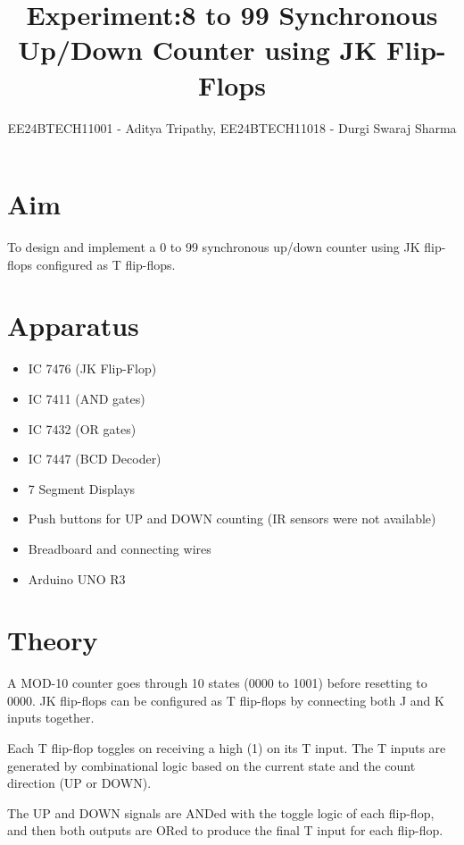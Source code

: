 \documentclass[a4paper,12pt]{article}
\title{Experiment:8 to 99 Synchronous Up/Down Counter using JK Flip-Flops}
\author{EE24BTECH11001 - Aditya Tripathy, EE24BTECH11018 - Durgi Swaraj Sharma}
\date{}
\begin{document}
\maketitle

\section*{Aim}
To design and implement a 0 to 99 synchronous up/down counter using JK flip-flops configured as T flip-flops.

\section*{Apparatus}
\begin{itemize}
  \item IC 7476 (JK Flip-Flop)
  \item IC 7411 (AND gates)
  \item IC 7432 (OR gates)
  \item IC 7447 (BCD Decoder)
  \item 7 Segment Displays
  \item Push buttons for UP and DOWN counting (IR sensors were not available)
  \item Breadboard and connecting wires
  \item Arduino UNO R3
\end{itemize}

\section*{Theory}
A MOD-10 counter goes through 10 states (0000 to 1001) before resetting to 0000. JK flip-flops can be configured as T flip-flops by connecting both J and K inputs together.

Each T flip-flop toggles on receiving a high (1) on its T input. The T inputs are generated by combinational logic based on the current state and the count direction (UP or DOWN).

The UP and DOWN signals are ANDed with the toggle logic of each flip-flop, and then both outputs are ORed to produce the final T input for each flip-flop.
\end{document}
